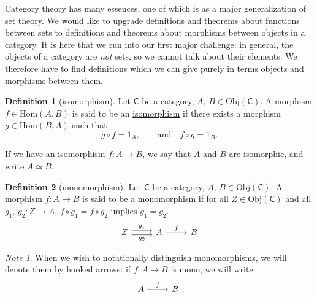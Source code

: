 \documentclass[a4paper,10pt]{scrreprt}
\newcommand{\defn}[1]{\ul{#1}}
\newcommand{\Obj}{\mathrm{Obj}}
\newcommand{\Hom}{\mathrm{Hom}}
\theoremstyle{definition}
\newtheorem{definition}{Definition}[section]
\theoremstyle{plain}
\theoremstyle{remark}
\newtheorem{note}{Note}[section]
\begin{document}
Category theory has many essences, one of which is as a major generalization of set theory. We would like to upgrade definitions and theorems about functions between sets to definitions and theorems about morphisms between objects in a category. It is here that we run into our first major challenge: in general, the objects of a category are \emph{not} sets, so we cannot talk about their elements. We therefore have to find definitions which we can give purely in terms objects and morphisms between them.
\begin{definition}[isomorphism]
  \label{def:isomorphism}
  Let $\mathsf{C}$ be a category, $A$, $B \in \Obj(\mathsf{C})$. A morphism $f \in \Hom(A,B)$ is said to be an \defn{isomorphism} if there exists a morphism $g \in \Hom(B,A)$ such that 
  \begin{equation*}
    g \circ f = 1_{A},\qquad\text{and}\quad f \circ g = 1_{B}.
  \end{equation*}

  If we have an isomorphism $f\colon A \to B$, we say that $A$ and $B$ are \defn{isomorphic}, and write $A \simeq B$.
\end{definition}

\begin{definition}[monomorphism]
  \label{def:monomorphism}
  Let $\mathsf{C}$ be a category, $A$, $B\in \Obj(\mathsf{C})$. A morphism $f\colon A \to B$ is said to be a \defn{monomorphism} if for all $Z \in \Obj(\mathsf{C})$ and all $g_{1}$, $g_{2}\colon Z \to A$, $f \circ g_{1} = f\circ g_{2}$ implies $g_{1} = g_{2}$.
  \begin{equation*}
    \begin{tikzcd}
      Z \arrow[r, shift left, "g_{1}"] \arrow[r, shift right, swap, "g_{2}"] & A \arrow[r, "f"] & B
    \end{tikzcd}
  \end{equation*}
\end{definition}

\begin{note}
  When we wish to notationally distinguish monomorphisms, we will denote them by hooked arrows: if $f\colon A \to B$ is mono, we will write
  \begin{equation*}
    \begin{tikzcd}
      A
      \arrow[r, hookrightarrow, "f"]
      & B
    \end{tikzcd}.
  \end{equation*}
\end{note}
\end{document}

